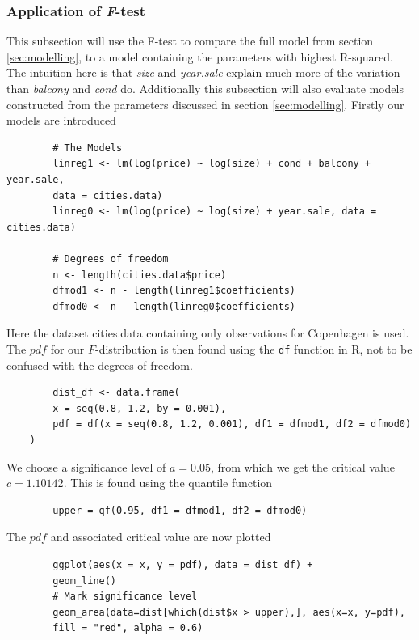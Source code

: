 \subsubsection{Application of \textit{F}-test}
    This subsection will use the F-test to compare the full model from section \ref{sec:modelling}, to a model containing the parameters with highest R-squared. 
    The intuition here is that \textit{size} and \textit{year.sale} explain much more of the variation than \textit{balcony} and \textit{cond} do.
    Additionally this subsection will also evaluate models constructed from the parameters discussed in section \ref{sec:modelling}.
    Firstly our models are introduced
    \begin{lstlisting}
        # The Models
        linreg1 <- lm(log(price) ~ log(size) + cond + balcony + year.sale, 
        data = cities.data)
        linreg0 <- lm(log(price) ~ log(size) + year.sale, data = cities.data)
        
        # Degrees of freedom
        n <- length(cities.data$price)
        dfmod1 <- n - length(linreg1$coefficients)
        dfmod0 <- n - length(linreg0$coefficients)
    \end{lstlisting}
    Here the dataset cities.data containing only observations for Copenhagen is used.
    The $pdf$ for our $F$-distribution is then found using the \texttt{df} function in R, not to be confused with the degrees of freedom. 
    
    \begin{lstlisting}
        dist_df <- data.frame(
        x = seq(0.8, 1.2, by = 0.001),
        pdf = df(x = seq(0.8, 1.2, 0.001), df1 = dfmod1, df2 = dfmod0)
    )
    \end{lstlisting}
    
    We choose a significance level of $a = 0.05$, from which we get the critical value $c=1.10142$. 
    This is found using the quantile function
    
    \begin{lstlisting}
        upper = qf(0.95, df1 = dfmod1, df2 = dfmod0)
    \end{lstlisting}
    
    The $pdf$ and associated critical value are now plotted
    
    \begin{lstlisting}
        ggplot(aes(x = x, y = pdf), data = dist_df) + 
        geom_line()
        # Mark significance level
        geom_area(data=dist[which(dist$x > upper),], aes(x=x, y=pdf), 
        fill = "red", alpha = 0.6)
    \end{lstlisting}
    
